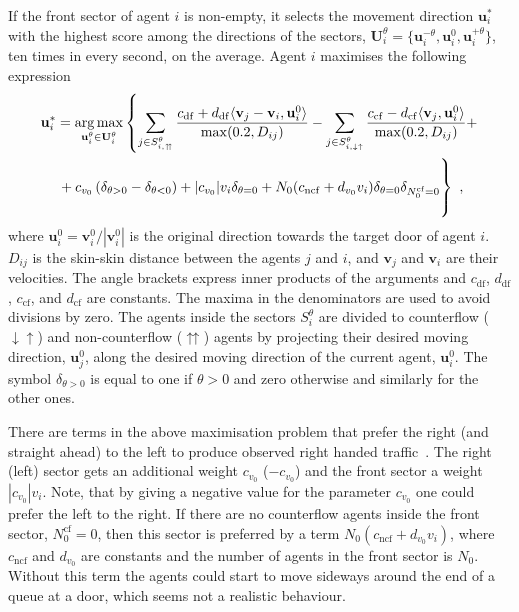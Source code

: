 \documentclass[12pt,a4paper,final,twoside]{stylevk}
\begin{document}
If the front sector of agent $i$ is non-empty, it selects the movement
direction $\mathbf{u}^*_i$ with the highest score among the directions
of the sectors, $\mathbf{U}^\theta_i = \lbrace \mathbf{u}^{-\theta}_i
, \mathbf{u}^{0}_i, \mathbf{u}^{+\theta}_i \rbrace$, ten times in every
second, on the average.  Agent $i$ maximises the following expression
%
\begin{multline}\label{Eq_CF}
  \mathbf{u}^*_i  =  \underset{\mathbf{u}^\theta_i \in
  \mathbf{U}^\theta_i} {\arg\max} \left\lbrace \sum_{j \in
  S^\theta_{i,\upuparrows}} \frac{ c_\mathrm{df}  + d_\mathrm{df}
  \langle \mathbf{v}_j - \mathbf{v}_i , \mathbf{u}^0_i \rangle
  }{\max(0.2, D_{ij})} - \sum_{j \in S^\theta_{i,\downarrow\uparrow}}
  \frac{ c_\mathrm{cf}  - d_\mathrm{cf}  \langle \mathbf{v}_j ,
  \mathbf{u}^0_i \rangle }{\max(0.2, D_{ij})} + \right. \\
  \left.  \vphantom{ \sum_{j \in
  S^\theta_{i,\upuparrows}} \frac{ c_\mathrm{df}  + d_\mathrm{df}
  \langle \mathbf{v}_j - \mathbf{v}_i , \mathbf{u}^0_i \rangle
  }{\max(0.2, D_{ij})} }
  + c_{v_0} \left( \delta_{\theta > 0}  - \delta_{\theta < 0}
  \right) + \vert c_{v_0} \vert v_i  \delta_{\theta = 0} + N_0 (
  c_\mathrm{ncf} + d_{v_0} v_i )\delta_{\theta =
  0}\delta_{N^\mathrm{cf}_0 = 0}  \right\rbrace   ~,
\end{multline}
%
where $\mathbf{u}^0_i = \mathbf{v}^0_i / |\mathbf{v}^0_i|$ is the
original direction towards the target door of agent $i$.  $D_{ij}$ is
the skin-skin distance between the agents $j$ and $i$, and
$\mathbf{v}_j$ and $\mathbf{v}_i$ are their velocities.  The angle
brackets express inner products of the arguments and $c_\mathrm{df}$,
$d_\mathrm{df}$, $c_\mathrm{cf}$, and $d_\mathrm{cf}$ are constants.
The maxima in the denominators are used to avoid divisions by zero.
The agents inside the sectors $S^\theta_i$ are divided to counterflow
($\downarrow\uparrow$) and non-counterflow ($\upuparrows$) agents by
projecting their desired moving direction, $\mathbf{u}^0_j$, along the
desired moving direction of the current agent, $\mathbf{u}^0_i$.  The
symbol $\delta_{\theta > 0}$ is equal to one if $\theta > 0$ and zero
otherwise and similarly for the other ones.


There are terms in the above maximisation problem that prefer the
right (and straight ahead) to the left to produce observed right
handed traffic~\cite{Duisburg06}.  The right (left) sector gets an
additional weight $c_{v_0}$ ($-c_{v_0}$) and the front sector a weight
$|c_{v_0}|v_i$.  Note, that by giving a negative value for the
parameter $c_{v_0}$ one could prefer the left to the right.  If there
are no counterflow agents inside the front sector, $N^\mathrm{cf}_0 =
0$, then this sector is preferred by a term $N_0(c_\mathrm{ncf} +
d_{v_0} v_i)$, where $c_\mathrm{ncf}$ and $d_{v_0}$ are constants and
the number of agents in the front sector is $N_0$.  Without this term
the agents could start to move sideways around the end of a queue at a
door, which seems not a realistic behaviour.
\end{document}
